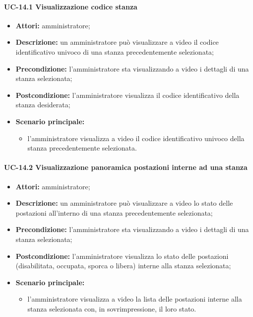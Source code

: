 \paragraph{UC-14.1 Visualizzazione codice stanza}
\begin{itemize}
    \item \textbf{Attori:} amministratore;
    \item \textbf{Descrizione:} un amministratore pu\`{o} visualizzare a video il codice identificativo univoco di una stanza precedentemente selezionata;
    \item \textbf{Precondizione:} l'amministratore sta visualizzando a video i dettagli di una stanza selezionata;
    \item \textbf{Postcondizione:} l'amministratore visualizza il codice identificativo della stanza desiderata;
    \item \textbf{Scenario principale:}
    \begin{itemize}
        \item l'amministratore visualizza a video il codice identificativo univoco della stanza precedentemente selezionata.
    \end{itemize}
\end{itemize}


\paragraph{UC-14.2 Visualizzazione panoramica postazioni interne ad una stanza}
\begin{itemize}
    \item \textbf{Attori:} amministratore;
    \item \textbf{Descrizione:} un amministratore pu\`{o} visualizzare a video lo stato delle postazioni all'interno di una stanza precedentemente selezionata;
    \item \textbf{Precondizione:} l'amministratore sta visualizzando a video i dettagli di una stanza selezionata;
    \item \textbf{Postcondizione:} l'amministratore visualizza lo stato delle postazioni (disabilitata, occupata, sporca o libera) interne alla stanza selezionata;
    \item \textbf{Scenario principale:}
    \begin{itemize}
        \item l'amministratore visualizza a video la lista delle postazioni interne alla stanza selezionata con, in sovrimpressione, il loro stato.
    \end{itemize}
\end{itemize}


